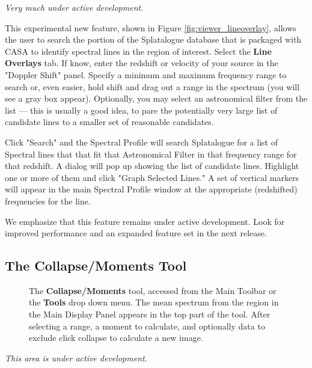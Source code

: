 {\em Very much under active development.}

This experimental new feature, shown in Figure \ref{fig:viewer_lineoverlay}, allows the user to search the portion of the Splatalogue database
that is packaged with CASA to identify spectral lines in the region of interest. Select the {\bf Line Overlays}
tab. If know, enter the redshift or velocity of your source in the "Doppler Shift" panel. Specify a minimum and maximum frequency range to
search or, even easier, hold shift and drag out a range in the spectrum (you will see a gray box appear). Optionally, you may select 
an astronomical filter from the list --- this is usually a good idea, to pare the potentially very large list of candidate lines to a smaller set of
reasonable candidates. 

Click "Search" and the Spectral Profile will search Splatalogue for a list of Spectral lines that that fit that Astronomical
Filter in that frequency range for that redshift. A dialog will pop up showing the list of candidate lines. Highlight one or more of them and
click "Graph Selected Lines." A set of vertical markers will appear in the main Spectral Profile window at the appropriate (redshifted)
frequencies for the line.

We emphasize that this feature remains under active development. Look for improved performance and an expanded feature set in the next release.


\subsection{The Collapse/Moments Tool}
\label{section:display.image.collapse}

\begin{figure}[h!]
\begin{center}
\caption{\label{fig:viewer_collapse} The {\bf Collapse/Moments} tool, accessed from
the Main Toolbar or the {\bf Tools} drop down menu. The mean spectrum from the region 
in the Main Display Panel appears in the top part of the tool. After selecting a range,
a moment to calculate, and optionally data to exclude click collapse to calculate a new image.}
\hrulefill
\end{center}
\end{figure}

{\em This area is under active development.}


